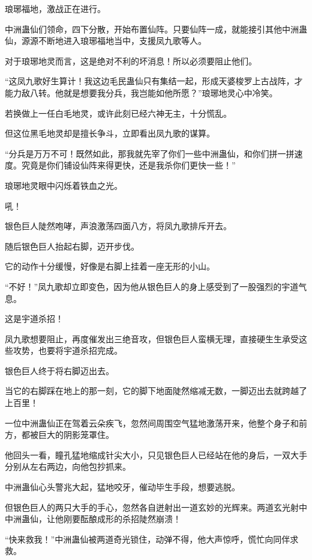 
\begin{this_body}

琅琊福地，激战正在进行。

中洲蛊仙们领命，四下分散，开始布置仙阵。只要仙阵一成，就能接引其他中洲蛊仙，源源不断地进入琅琊福地当中，支援凤九歌等人。

对于琅琊地灵而言，这是绝对不利的坏消息！所以必须要阻止他们。

“这凤九歌好生算计！我这边毛民蛊仙只有集结一起，形成天婆梭罗上古战阵，才能力敌八转。他就是想要我分兵，我岂能如他所愿？”琅琊地灵心中冷笑。

若换做上一任白毛地灵，或许此刻已经六神无主，十分慌乱。

但这位黑毛地灵却是擅长争斗，立即看出凤九歌的谋算。

“分兵是万万不可！既然如此，那我就先宰了你们一些中洲蛊仙，和你们拼一拼速度。究竟是你们铺设仙阵来得更快，还是我杀你们更快一些！”

琅琊地灵眼中闪烁着铁血之光。

吼！

银色巨人陡然咆哮，声浪激荡四面八方，将凤九歌排斥开去。

随后银色巨人抬起右脚，迈开步伐。

它的动作十分缓慢，好像是右脚上挂着一座无形的小山。

“不好！”凤九歌却立即变色，因为他从银色巨人的身上感受到了一股强烈的宇道气息。

这是宇道杀招！

凤九歌想要阻止，再度催发出三绝音攻，但银色巨人蛮横无理，直接硬生生承受这些攻势，也要将宇道杀招完成。

银色巨人终于将右脚迈出去。

当它的右脚踩在地上的那一刻，它的脚下地面陡然缩减无数，一脚迈出去就跨越了上百里！

一位中洲蛊仙正在驾着云朵疾飞，忽然间周围空气猛地激荡开来，他整个身子和前方，都被巨大的阴影笼罩住。

他回头一看，瞳孔猛地缩成针尖大小，只见银色巨人已经站在他的身后，一双大手分别从左右两边，向他包抄抓来。

中洲蛊仙心头警兆大起，猛地咬牙，催动毕生手段，想要逃脱。

但银色巨人的两只大手的手心，忽然各自迸射出一道玄妙的光辉来。两道玄光射中中洲蛊仙，让他刚要酝酿成形的杀招陡然崩溃！

“快来救我！”中洲蛊仙被两道奇光锁住，动弹不得，他大声惊呼，慌忙向同伴求救。


\end{this_body}

